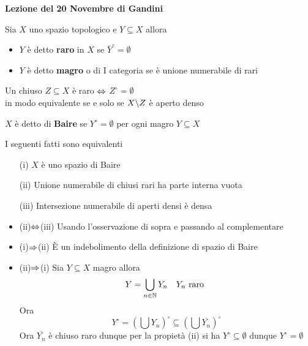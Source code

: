 


\textbf{Lezione del 20 Novembre di Gandini}
\begin{defn}Sia $X$ uno spazio topologico e $Y \subseteq X$ allora 
\begin{itemize}
\item $Y$ \`e detto \textbf{ raro } in $X$ se $\overline{Y}^\circ =\emptyset$
\item $Y$ \`e detto \textbf{ magro } o di I categoria  se \`e unione numerabile di rari 
\end{itemize}
\end{defn}
\begin{oss}Un chiuso $Z\subseteq X $ \`e raro $\Leftrightarrow$ $Z^\circ= \emptyset$\\
in modo equivalente se e solo se $X \backslash Z$ \`e aperto denso
\end{oss}
\begin{defn}$X$ \`e detto di \textbf{ Baire } se $Y^\circ = \emptyset$ per ogni magro $Y \subseteq X$
\end{defn}
\begin{prop}I seguenti fatti sono equivalenti
\begin{itemize}
\item[(i)]$X$ \`e uno spazio di Baire
\item[(ii)]Unione numerabile di chiusi rari ha parte interna vuota
\item[(iii)]Intersezione numerabile di aperti densi \`e densa
\end{itemize}
\proof \bbianco
\begin{itemize}
\item (ii)$\Leftrightarrow$(iii) Usando l'osservazione di sopra e passando al complementare
\item (i)$\Rightarrow$(ii) \`E un indebolimento della definizione di spazio di Baire
\item (ii)$\Rightarrow$(i) Sia $Y \subseteq X$ magro allora 
$$ Y = \bigcup_{n \in \mathbb{N}} Y_n \quad Y_n \text{ raro }$$
Ora 
$$ Y^\circ = \left( \bigcup Y_n \right)^\circ \subseteq \left( \bigcup \overline{Y_n} \right)^\circ$$
Ora $\overline{Y_n}$ \`e chiuso raro dunque per la propiet\`a  (ii) si ha  $Y^\circ \subseteq \emptyset$ dunque $Y^\circ = \emptyset$ 
\end{itemize}
\end{prop}
